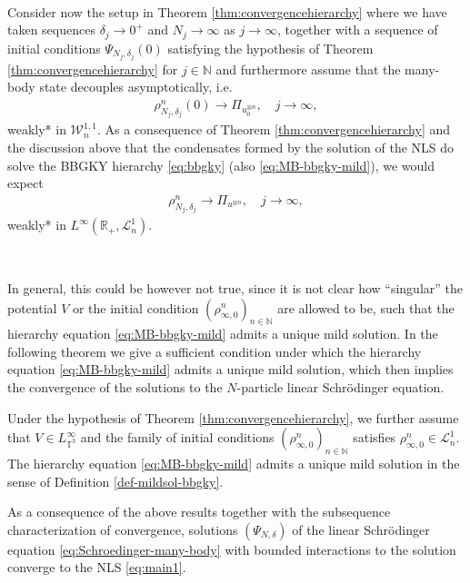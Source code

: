 \

Consider now the setup in Theorem \ref{thm:convergencehierarchy} where we
have taken sequences $\delta_j \rightarrow 0^+$ and $N_j \rightarrow \infty$
as $j \rightarrow \infty$, together with a sequence of initial conditions
$\Psi_{N_j, \delta_j} (0)$ satisfying the hypothesis of Theorem
\ref{thm:convergencehierarchy} for $j \in \mathbb{N}$ and furthermore assume that the many-body state decouples asymptotically, i.e.
\begin{align*}
\rho_{N_j, \delta_j}^n(0) \rightarrow \Pi_{u_0^{\otimes n}}, \quad j \rightarrow \infty,
 \end{align*}
weakly* in $\mathcal{W}^{1, 1}_n$. As a consequence of Theorem
\ref{thm:convergencehierarchy} and the discussion above that the condensates formed by the solution of the NLS do solve the BBGKY hierarchy \eqref{eq:bbgky} (also \eqref{eq:MB-bbgky-mild}), we would expect
\begin{align*}
\rho_{N_j, \delta_j}^n \rightarrow \Pi_{u^{\otimes n}}, \quad j \rightarrow \infty,
 \end{align*}
weakly*
in $L^{\infty} (\mathbb{R}_+, \mathcal{L}^1_n)$.

\

In general, this could be however not true, since it is not clear how
``singular'' the potential $V$ or the initial condition $(\rho_{\infty,
0}^n)_{n \in \mathbb{N}}$ are allowed to be, such that the hierarchy equation
\eqref{eq:MB-bbgky-mild} admits a unique mild solution. In the following
theorem we give a sufficient condition under which the hierarchy
equation \eqref{eq:MB-bbgky-mild} admits a unique mild solution, which then
implies the convergence of the solutions to the $N$-particle linear
Schr{\"o}dinger equation. \

\begin{thm}
  \label{thm:unique-BBGKY-Linf}Under the hypothesis of Theorem
  \ref{thm:convergencehierarchy}, we further assume that $V \in
  L_{\mathbb{T}^3}^{\infty}$ and the family of initial conditions
  $(\rho_{\infty, 0}^n)_{n \in \mathbb{N}}$ satisfies $\rho_{\infty, 0}^n \in
  \mathcal{L}^1_n$. The hierarchy equation \eqref{eq:MB-bbgky-mild}
  admits a unique mild solution in the sense of Definition
  \ref{def-mildsol-bbgky}.
\end{thm}

As a consequence of the above results together with the subsequence characterization of convergence, solutions $(\Psi_{N, \delta}) $ of the linear
Schr{\"o}dinger equation \eqref{eq:Schroedinger-many-body} with bounded interactions to
the solution converge to the NLS \eqref{eq:main1}.

